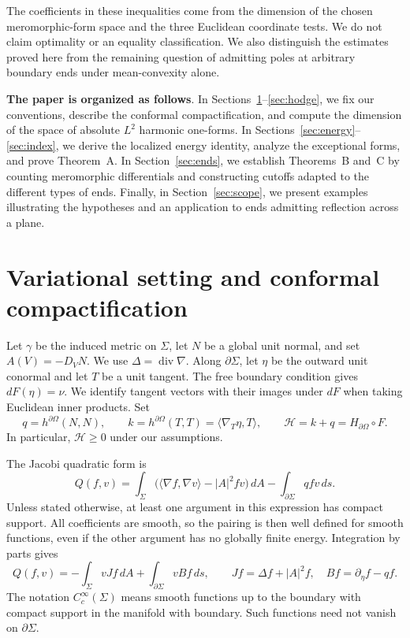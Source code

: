 \documentclass[11pt]{amsart}
\numberwithin{equation}{section}
\theoremstyle{definition}
\theoremstyle{remark}
\newcommand{\dd}{\,d}
\DeclareMathOperator{\diver}{div}
\begin{document}
The coefficients in these inequalities come from the dimension of the chosen meromorphic-form space and the three Euclidean coordinate tests. We do not claim optimality or an equality classification. We also distinguish the estimates proved here from the remaining question of admitting poles at arbitrary boundary ends under mean-convexity alone.

\textbf{The paper is organized as follows}. In Sections~\ref{sec:preliminaries}--\ref{sec:hodge}, we fix our conventions, describe the conformal compactification, and compute the dimension of the space of absolute $L^2$ harmonic one-forms. In Sections~\ref{sec:energy}--\ref{sec:index}, we derive the localized energy identity, analyze the exceptional forms, and prove Theorem~A. In Section~\ref{sec:ends}, we establish Theorems~B and~C by counting meromorphic differentials and constructing cutoffs adapted to the different types of ends. Finally, in Section~\ref{sec:scope}, we present examples illustrating the hypotheses and an application to ends admitting reflection across a plane.


\section{Variational setting and conformal compactification}\label{sec:preliminaries}
Let $\gamma$ be the induced metric on $\Sigma$, let $N$ be a global unit normal, and set $A(V)=-D_VN$. We use $\Delta=\diver\nabla$. Along $\partial\Sigma$, let $\eta$ be the outward unit conormal and let $T$ be a unit tangent. The free boundary condition gives $dF(\eta)=\nu$. We identify tangent vectors with their images under $dF$ when taking Euclidean inner products. Set
\begin{equation}\label{eq:boundary-notation}
q=h^{\partial\Omega}(N,N),\qquad
k=h^{\partial\Omega}(T,T)=\langle\nabla_T\eta,T\rangle,
\qquad \mathscr H=k+q=H_{\partial\Omega}\circ F.
\end{equation}
In particular, $\mathscr H\ge0$ under our assumptions.

The Jacobi quadratic form is
\begin{equation}\label{eq:quadratic-form}
Q(f,v)=\int_\Sigma\bigl(\langle\nabla f,\nabla v\rangle-|A|^2fv\bigr)\dd A
-\int_{\partial\Sigma}qfv\dd s.
\end{equation}
Unless stated otherwise, at least one argument in this expression has compact support. All coefficients are smooth, so the pairing is then well defined for smooth functions, even if the other argument has no globally finite energy. Integration by parts gives
\[
Q(f,v)=-\int_\Sigma vJf\dd A+\int_{\partial\Sigma}vBf\dd s,
\qquad Jf=\Delta f+|A|^2f,\quad Bf=\partial_\eta f-qf.
\]
The notation $C_c^\infty(\Sigma)$ means smooth functions up to the boundary with compact support in the manifold with boundary. Such functions need not vanish on $\partial\Sigma$.
\end{document}
